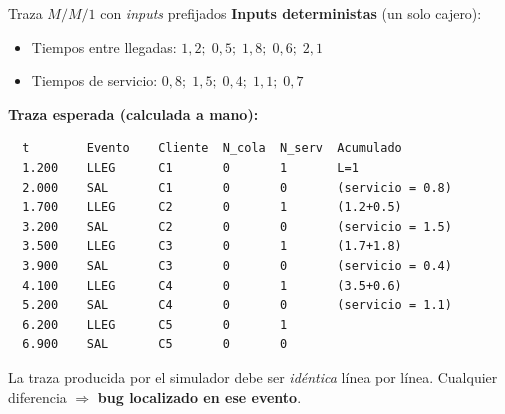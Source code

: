 \documentclass[aspectratio=1610, 10pt]{beamer}
\begin{document}
\begin{frame}[fragile]{Traza $M/M/1$ con \emph{inputs} prefijados}
  \footnotesize
  \textbf{Inputs deterministas} (un solo cajero):
  \begin{itemize}\scriptsize\itemsep0pt
    \item Tiempos entre llegadas: $1{,}2;\;0{,}5;\;1{,}8;\;0{,}6;\;2{,}1$
    \item Tiempos de servicio: \;\;\;\;\;\;\;\;$0{,}8;\;1{,}5;\;0{,}4;\;1{,}1;\;0{,}7$
  \end{itemize}

  \vspace{4pt}
  \textbf{Traza esperada (calculada a mano):}
\begin{lstlisting}
  t        Evento    Cliente  N_cola  N_serv  Acumulado
  1.200    LLEG      C1       0       1       L=1
  2.000    SAL       C1       0       0       (servicio = 0.8)
  1.700    LLEG      C2       0       1       (1.2+0.5)
  3.200    SAL       C2       0       0       (servicio = 1.5)
  3.500    LLEG      C3       0       1       (1.7+1.8)
  3.900    SAL       C3       0       0       (servicio = 0.4)
  4.100    LLEG      C4       0       1       (3.5+0.6)
  5.200    SAL       C4       0       0       (servicio = 1.1)
  6.200    LLEG      C5       0       1
  6.900    SAL       C5       0       0
\end{lstlisting}

  \vspace{2pt}
  \begin{alertabox}
    \footnotesize
    La traza producida por el simulador debe ser \emph{idéntica} línea por línea.
    Cualquier diferencia $\Rightarrow$ \textbf{bug localizado en ese evento}.
  \end{alertabox}
\end{frame}
\end{document}
